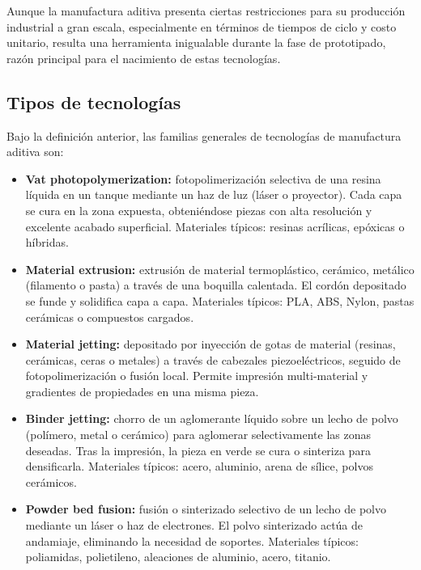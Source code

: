 Aunque la manufactura aditiva presenta ciertas restricciones para su producción industrial a gran escala, especialmente en términos de tiempos de ciclo y costo unitario, resulta una herramienta inigualable durante la fase de prototipado, razón principal para el nacimiento de estas tecnologías.

\subsection{Tipos de tecnologías}

Bajo la definición anterior, las familias generales de tecnologías de manufactura aditiva son:

\begin{itemize}
  \item \textbf{Vat photopolymerization:}  
    fotopolimerización selectiva de una resina líquida en un tanque mediante un haz de luz (láser o proyector). Cada capa se cura en la zona expuesta, obteniéndose piezas con alta resolución y excelente acabado superficial. Materiales típicos: resinas acrílicas, epóxicas o híbridas.

  \item \textbf{Material extrusion:}  
    extrusión de material termoplástico, cerámico, metálico (filamento o pasta) a través de una boquilla calentada. El cordón depositado se funde y solidifica capa a capa. Materiales típicos: PLA, ABS, Nylon, pastas cerámicas o compuestos cargados.

  \item \textbf{Material jetting:}  
    depositado por inyección de gotas de material (resinas, cerámicas, ceras o metales) a través de cabezales piezoeléctricos, seguido de fotopolimerización o fusión local. Permite impresión multi-material y gradientes de propiedades en una misma pieza.

  \item \textbf{Binder jetting:}  
    chorro de un aglomerante líquido sobre un lecho de polvo (polímero, metal o cerámico) para aglomerar selectivamente las zonas deseadas. Tras la impresión, la pieza en verde se cura o sinteriza para densificarla. Materiales típicos: acero, aluminio, arena de sílice, polvos cerámicos.

  \item \textbf{Powder bed fusion:}  
    fusión o sinterizado selectivo de un lecho de polvo mediante un láser o haz de electrones. El polvo sinterizado actúa de andamiaje, eliminando la necesidad de soportes. Materiales típicos: poliamidas, polietileno, aleaciones de aluminio, acero, titanio.


\end{itemize}

